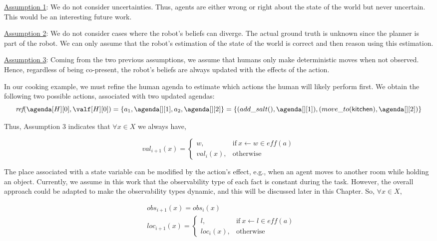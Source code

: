 {\underline{Assumption 1}: We do not consider uncertainties. Thus, agents are either wrong or right about the state of the world but never uncertain. This would be an interesting future work. 

\underline{Assumption 2}: We do not consider cases where the robot's beliefs can diverge. The actual ground truth is unknown since the planner is part of the robot. We can only assume that the robot's estimation of the state of the world is correct and then reason using this estimation.

\underline{Assumption 3}: Coming from the two previous assumptions, we assume that humans only make deterministic moves when not observed. Hence, regardless of being co-present, the robot's beliefs are always updated with the effects of the action.

In our cooking example, we must refine the human agenda to estimate which actions the human will likely perform first. We obtain the following two possible actions, associated with two updated agendas:\\
{\small
\begin{equation*}
    \textit{ref}(\agenda[H][0], \valf[H][0]) = \{ a_1,\agenda[][1], a_2,\agenda[][2] \}= \{ (add\_salt(),\agenda[][1]), (move\_to(\textsf{kitchen}),\agenda[][2]) \}
\end{equation*}
}

Thus, Assumption 3 indicates that $\forall x \in X$ we always have,

\begin{equation}
    val_{i+1}(x) = \left\{ 
    \begin{array}{ll}
        w, & \mbox{if} ~ x \leftarrow w \in \textit{eff}(a)   \\ 
        val_i(x), & \mbox{otherwise}
    \end{array}\right.
\end{equation}

The place associated with a state variable can be modified by the action's effect, e.g., when an agent moves to another room while holding an object. 
Currently, we assume in this work that the observability type of each fact is constant during the task. 
However, the overall approach could be adapted to make the observability types dynamic, and this will be discussed later in this Chapter.
So, $\forall x \in X$,

\begin{align}
    &obs_{i+1}(x) = obs_i(x) \label{eq:obs_update}\\
    &loc_{i+1}(x) = \left\{ 
    \begin{array}{ll}
        l, & \mbox{if} ~ x \leftarrow l \in \textit{eff}(a)\\
        loc_i(x), & \mbox{otherwise}
    \end{array}\right.
\end{align}

}
